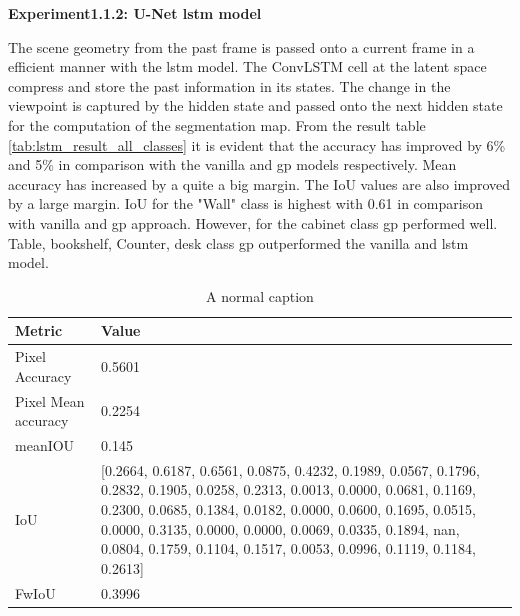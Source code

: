     \newpage
	{ \bf Experiment1.1.2: U-Net lstm model}
	
	The scene geometry from the past frame is passed onto a current frame in a efficient manner with the lstm model. The ConvLSTM cell at the latent space compress and store the past information in its states. The change in the viewpoint is captured by the hidden state and passed onto the next hidden state for the computation of the segmentation map. From the result table \ref{tab:lstm_result_all_classes} it is evident that the accuracy has improved by 6\% and 5\% in comparison with the vanilla and gp models respectively. Mean accuracy has increased by a quite a big margin. The IoU values are also improved by a large margin. IoU for the "Wall" class is highest with 0.61 in comparison with vanilla and gp approach. However, for the cabinet class gp performed well. Table, bookshelf, Counter, desk class gp outperformed the vanilla and lstm model. 
	
	\begin{table}
	\begin{center}
		\begin{tabular}{ | l | p{12cm} |}
			\hline		
			\cellcolor{purple!30}Metric & \cellcolor{purple!30}Value \\ \hline
			Pixel Accuracy & 0.5601 \\ \hline
			Pixel Mean accuracy & 0.2254  \\ \hline
			meanIOU & 0.145 \\ \hline
			IoU & [0.2664, 0.6187, 0.6561, 0.0875, 0.4232, 0.1989, 0.0567, 0.1796, 0.2832,
			0.1905, 0.0258, 0.2313, 0.0013, 0.0000, 0.0681, 0.1169, 0.2300, 0.0685,
			0.1384, 0.0182, 0.0000, 0.0600, 0.1695, 0.0515, 0.0000, 0.3135, 0.0000,
			0.0000, 0.0069, 0.0335, 0.1894,    nan, 0.0804, 0.1759, 0.1104, 0.1517,
			0.0053, 0.0996, 0.1119, 0.1184, 0.2613] \\ \hline
			FwIoU & 0.3996 \\ \hline
			\hline
		\end{tabular}
		\caption{A normal caption}
		\label{tab:caption}
	\end{center}
	\end{table}
	
